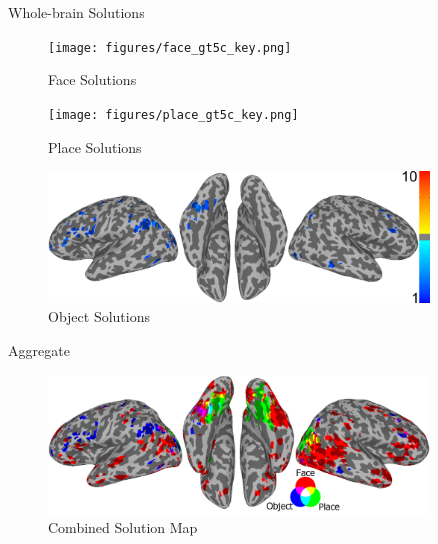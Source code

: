 \documentclass[final]{beamer}
\newlength{\sepwid}
\newlength{\introcolwid}
\begin{document}
\begin{frame}[t]
\begin{columns}[t]
\begin{column}{\introcolwid}
		\begin{block}{Whole-brain Solutions}
			\begin{figure}
				\texttt{[image: figures/face\_gt5c\_key.png]}
				\caption{Face Solutions}
			\end{figure}
			\begin{figure}
				\texttt{[image: figures/place\_gt5c\_key.png]}
				\caption{Place Solutions}
			\end{figure}
			\begin{figure}
				\includegraphics[width=\textwidth]{figures/object_gt5c_key.png}
				\caption{Object Solutions}
			\end{figure}
		\end{block}
          \begin{block}{Aggregate}
			\begin{figure}
				\includegraphics[width=\textwidth]{figures/FPO_gt5b2.png}
				\caption{Combined Solution Map}
			\end{figure}
          \end{block}
	\end{column}
	\begin{column}{\sepwid}\end{column}			%
	\begin{column}{\introcolwid}

\end{column}
\end{columns}
\end{frame}
\end{document}
